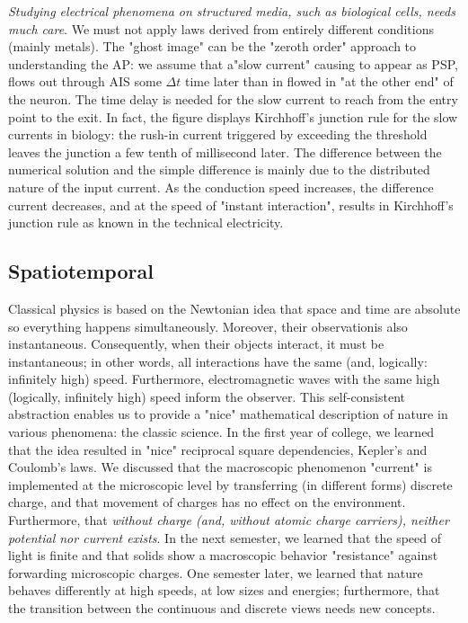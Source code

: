 \textit{Studying electrical phenomena on structured
media, such as biological cells, needs much care}. We must not apply
laws derived from entirely different conditions (mainly metals).
The "ghost image" can be the "zeroth order" approach to understanding
the \gls{AP}: we assume that a"slow current" causing to appear as  \gls{PSP}, flows out through \gls{AIS} some $\Delta t$ time later 
than in flowed in "at the other end" of the neuron.
The time delay is needed for the slow current 
to reach from  the entry point to the exit.
In fact, the figure displays Kirchhoff's junction rule for 
the slow currents in biology: the rush-in current 
triggered by exceeding the threshold leaves the junction
a few tenth of millisecond later.
The difference between the numerical solution and the 
simple difference is mainly due to the distributed nature 
of the input current. As the conduction speed increases,
the difference current decreases, and at the speed of "instant 
interaction", results in Kirchhoff's junction rule as 
known in the technical electricity.

\subsection{Spatiotemporal\label{sec:Physics-Spatiotemporal}}

Classical physics is based on the Newtonian idea that  space and time are absolute so everything happens simultaneously. Moreover, their observationis also instantaneous. Consequently, when their objects
interact, it must be instantaneous; in other words,
all interactions have the same (and, logically: infinitely high) speed. Furthermore, electromagnetic
waves with the same high (logically, infinitely high) speed inform the observer. This
self-consistent abstraction enables us to provide a "nice"
mathematical description of nature in various phenomena: the classic
science. In the first year of college, we learned that the idea resulted
in "nice" reciprocal square dependencies, Kepler's and Coulomb's
laws. We discussed that the macroscopic phenomenon "current" is
implemented at the microscopic level by transferring (in different
forms) discrete charge, and that movement of charges has no effect on the environment. Furthermore, that \textit{without charge (and, without atomic charge carriers),
neither potential nor current exists}. In the next semester, we learned
that the speed of light is finite and that solids show a macroscopic
behavior "resistance" against forwarding microscopic charges.
One semester later, we learned that nature behaves differently
at high speeds, at low sizes and energies;
furthermore, that the transition between the continuous and discrete 
views needs new concepts.

